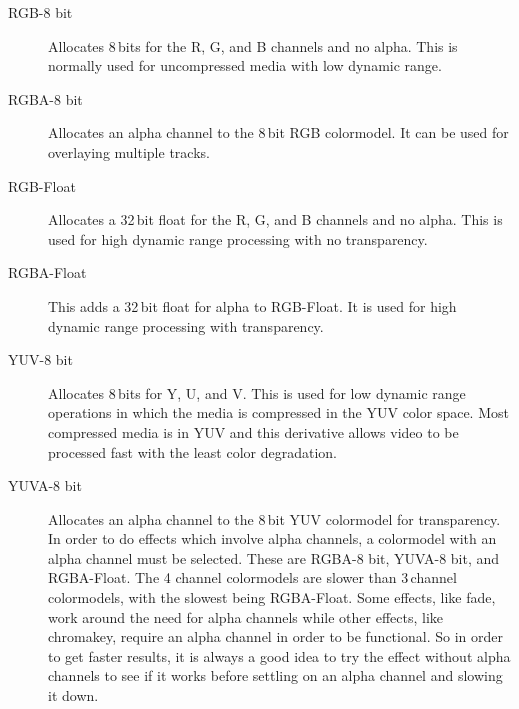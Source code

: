 \begin{description}
        \begin{description}
            \item[RGB-8 bit] 
                Allocates 8\,bits for the R, G, and B channels and no alpha. This is normally used for uncompressed media with low dynamic range.
            \item[RGBA-8 bit]
                Allocates an alpha channel to the 8\,bit RGB colormodel. It can be used for overlaying multiple tracks.\\
            \item[RGB-Float]
                Allocates a 32\,bit float for the R, G, and B channels and no alpha. This is used  for high dynamic range processing with no transparency.
            \item[RGBA-Float]
                This adds a 32\,bit float for alpha to RGB-Float. It is used for high dynamic range processing with transparency.\\
            \item[YUV-8 bit]
                Allocates 8\,bits for Y, U, and V. This is used for low dynamic range operations in which the media is compressed in the YUV color space. Most compressed media is in YUV and this derivative allows video to be processed fast with the least color degradation.
            \item[YUVA-8 bit]
                Allocates an alpha channel to the 8\,bit YUV colormodel for transparency.
                In order to do effects which involve alpha channels, a colormodel with an alpha channel must be selected. 
                These are RGBA-8 bit, YUVA-8 bit, and RGBA-Float. 
                The 4 channel colormodels are slower than 3\,channel colormodels, with the slowest being RGBA-Float. 
                Some effects, like fade, work around the need for alpha channels while other effects, like chromakey, require an alpha channel in order to be functional.  
                So in order to get faster results, it is always a good idea to try the effect without alpha channels to see if it works before settling on an alpha channel and slowing it down.


\end{description}
\end{description}
